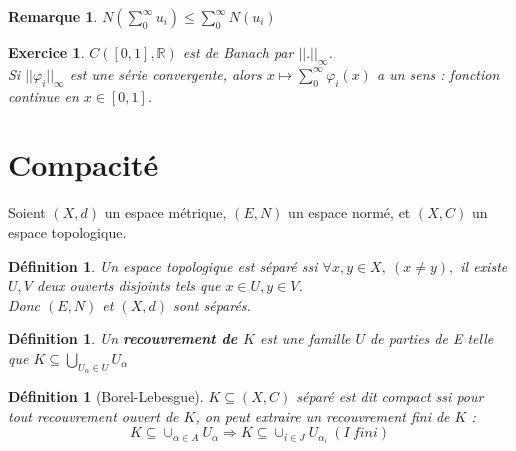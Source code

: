 \documentclass[a4paper, oneside]{report}
\theoremstyle{break}
\newtheorem{defi}[thm]{Définition}
\newtheorem{remar}[thm]{Remarque}
\newtheorem{exo}[thm]{Exercice}
\newcommand{\R}{\mathbb{R}}
\newcommand{\etop}{espace topologique }
\begin{document}
\begin{remar}
$N(\sum_{0}^\infty u_i) \leq \sum_{0}^\infty N(u_i)$
\end{remar}


\begin{exo}
$C([0,1], \R)$ est de Banach par $||.||_\infty$.\\
Si $||\varphi_i||_\infty$ est une série convergente, alors $x\mapsto \sum_{0}^\infty \varphi_i(x)$ a un sens : fonction continue en $x\in [0,1]$.
\end{exo}


\section{Compacité}

Soient $(X,d)$ un espace métrique, $(E,N)$ un espace normé, et $(X,C)$ un espace topologique.

\begin{defi}
Un \etop est séparé ssi $\forall x,y\in X,~(x\neq y),$ il existe $U,V$ deux ouverts disjoints tels que $x\in U, y\in V$.\\
Donc $(E,N)$ et $(X,d)$ sont séparés.
\end{defi}

\begin{defi}
Un \textbf{recouvrement de $K$} est une famille $U$ de parties de E telle que $K\subseteq\bigcup_{U_\alpha\in U} U_\alpha$
\end{defi}


\begin{defi}[Borel-Lebesgue]
$K\subseteq (X,C)$ séparé est dit compact ssi pour tout recouvrement ouvert de $K$, on peut extraire un recouvrement fini de $K$ :
$$K\subseteq \cup_{\alpha \in A}U_\alpha \Rightarrow K\subseteq \cup_{i\in J}U_{\alpha_i}~(I~fini)$$
\end{defi}
\end{document}
